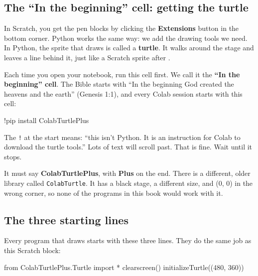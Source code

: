 \subsection*{The ``In the beginning'' cell: getting the turtle}

In Scratch, you get the pen blocks by clicking the \textbf{Extensions} button in the bottom corner. Python works the same way: we add the drawing tools we need. In Python, the sprite that draws is called a \textbf{turtle}. It walks around the stage and leaves a line behind it, just like a Scratch sprite after .

Each time you open your notebook, run this cell first. We call it the \textbf{``In the beginning'' cell}. The Bible starts with ``In the beginning God created the heavens and the earth'' (Genesis 1:1), and every Colab session starts with this cell:

\begin{typethis}
!pip install ColabTurtlePlus
\end{typethis}

The \texttt{!} at the start means: ``this isn't Python. It is an instruction for Colab to download the turtle tools.'' Lots of text will scroll past. That is fine. Wait until it stops.

\begin{watchout}
It must say \textbf{ColabTurtlePlus}, with \textbf{Plus} on the end. There is a different, older library called \texttt{ColabTurtle}. It has a black stage, a different size, and (0, 0) in the wrong corner, so none of the programs in this book would work with it.
\end{watchout}

\subsection*{The three starting lines}

Every program that draws starts with these three lines. They do the same job as this Scratch block:\par{}

\begin{typethis}
from ColabTurtlePlus.Turtle import *
clearscreen()
initializeTurtle((480, 360))
\end{typethis}

